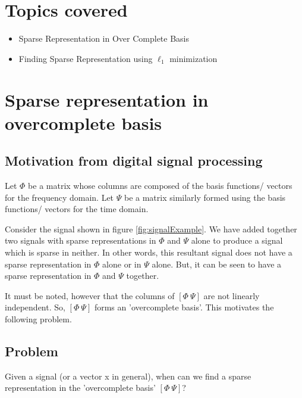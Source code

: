 \documentclass[12pt]{report}
\begin{document}

\maketitle


\section{Topics covered}
\begin{itemize}
\item Sparse Representation in Over Complete Basis
\item Finding Sparse Representation using $\ell_1$ minimization
\end{itemize}

\section{Sparse representation in overcomplete basis}
\subsection{Motivation from digital signal processing}
Let $\Phi$ be a matrix whose columns are composed of the basis functions/ vectors for the frequency domain. Let $\Psi$ be a matrix similarly formed using the basis functions/ vectors for the time domain.

Consider the signal shown in figure \ref{fig:signalExample}. We have added together two signals with sparse representations in $\Phi$ and $\Psi$ alone to produce a signal which is sparse in neither. In other words, this resultant signal does not have a sparse representation in $\Phi$ alone or in $\Psi$ alone. But, it can be seen to have a sparse representation in $\Phi$ and $\Psi$ together.

It must be noted, however that the columns of $[\Phi\ \Psi]$ are not linearly independent. So, $[\Phi\ \Psi]$ forms an 'overcomplete basis'. This motivates the following problem.

\subsection{Problem}
Given a signal (or a vector x in general), when can we find a sparse representation in the 'overcomplete basis' $[\Phi\ \Psi]$?
\end{document}
